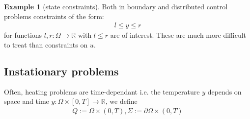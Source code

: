 \documentclass[a4paper,11pt,fleqn]{book}
\theoremstyle{definition}
\newtheorem*{example}{Example}
\theoremstyle{remark}
\begin{document}
\begin{example}[state constraints]
	Both in boundary and distributed control problems constraints of the form:
	\begin{align*}
		 l \le y \le r
	\end{align*}
	for functions $l, r: \Omega \rightarrow \mathbb{R}$ with $l \le r$ are of interest. These are much more difficult to treat than constraints on $u$. 
\end{example}


\subsection{Instationary problems}
Often, heating problems are time-dependant i.e. the temperature $y$ depends on space and time $y:\Omega \times [0, T] \rightarrow \mathbb{R}$, we define 
\begin{align*}
	Q:= \Omega \times (0, T), \Sigma:= \partial \Omega \times (0, T)
\end{align*}
\end{document}
